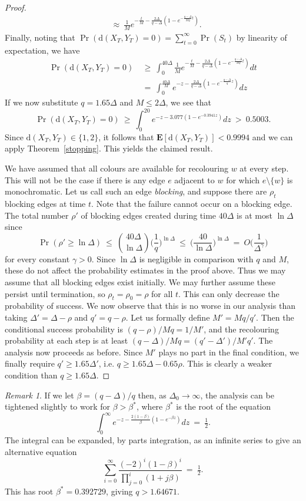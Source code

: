 \documentclass[11pt]{article}
\theoremstyle{definition}
\theoremstyle{remark}
\newtheorem{rem}[thm]{Remark}
\newcommand{\e}{\mathbf{E}}
\begin{document}
\begin{proof}
\begin{align*}
&\approx \ \frac{1}{M}
e^{-\frac{t}{M}-\frac{2\Delta}{q-\Delta}(1-e^{-\frac{q-\Delta}{Mq}t})}.
\end{align*}
Finally, noting that $\Pr(\mathrm{d}(X_T,Y_T)=0)=\sum_{t=0}^{\infty}
\Pr(S_t)$ by linearity of expectation, we have
\begin{align*}
\Pr(\mathrm{d}(X_T,Y_T)=0)\ &\geq\ \int_0^{40\Delta} \frac{1}{M} e^{-\frac{t}{M}-\frac{2\Delta}{q-\Delta}(1-e^{-\frac{q-\Delta}{Mq}t})}dt\\
&=\ \int_0^{\frac{40 \Delta}{M}}
e^{-z-\frac{2\Delta}{q-\Delta}(1-e^{-\frac{q-\Delta}{q}z})}dz
\end{align*}
If we now substitute $q=1.65 \Delta$ and $M\leq 2\Delta$, we see
that
\[\Pr(\mathrm{d}(X_T,Y_T)=0)\ \geq\ \int_0^{20} e^{-z-3.077(1-e^{-0.3941z})}dz\ >\
0.5003.\] Since $\mathrm{d}(X_T,Y_T)\in \{1,2\}$, it follows that
$\e[\mathrm{d}(X_T,Y_T)]< 0.9994$ and we can apply Theorem~\ref{stopping}.
This yields the claimed result.

We have assumed that all colours are available for recolouring $w$ at every
step. This will not be the case if there is any edge $e$ adjacent to $w$
for which $e\setminus\{w\}$ is monochromatic. Let us call such an edge
\emph{blocking}, and suppose there are $\rho_t$ blocking edges at time $t$.
Note that the failure cannot occur on a blocking edge. The total number
$\rho'$ of blocking edges created during time $40\Delta$ is at
most $\ln\Delta$ since%
\[ \Pr(\rho' \geq \ln\Delta)\ \leq\
\binom{40\Delta}{\ln\Delta}\Big(\frac{1}{q}\Big)^{\ln\Delta}\ \leq\
\Big(\frac{40}{\ln\Delta}\Big)^{\ln\Delta}\ =\ O\Big(\frac{1}{\Delta^\gamma}\Big)\]%
for every constant $\gamma>0$. Since $\ln\Delta$ is negligible in
comparison with $q$ and $M$, these do not affect the probability estimates
in the proof above. Thus we may assume that all blocking edges exist
initially. We may further assume these persist until termination, so
$\rho_t=\rho_0=\rho$ for all $t$. This can only decrease the probability of
success. We now observe that this is no worse in our analysis than taking
$\Delta'=\Delta-\rho$ and $q'=q-\rho$. Let us formally define $M'=Mq/q'$.
Then the conditional success probability is $(q-\rho)/Mq=1/M'$, and the
recolouring probability at each step is at least
$(q-\Delta)/Mq=(q'-\Delta')/M'q'$. The analysis now proceeds as before.
Since $M'$ plays no part in the final condition, we finally require $q'
\geq 1.65\Delta'$, i.e. $q \geq 1.65\Delta-0.65\rho$. This is clearly a
weaker condition than $q \geq 1.65\Delta$.
\end{proof}
\begin{rem}
If we let $\beta=(q-\Delta)/q$ then, as $\Delta_0\rightarrow\infty$, the
analysis can be tightened slightly to work for $\beta>\beta^*$, where
$\beta^*$ is the root of the
equation%
\[ \int_0^{\infty}
e^{-z-\frac{2(1-\beta)}{\beta}(1-e^{-\beta z})}dz\ =\ \tfrac{1}{2}.\]%
The integral can be expanded, by parts integration, as an infinite series
to give an alternative equation%
\[ \sum_{i=0}^\infty \frac{(-2)^i(1-\beta)^i}{\prod_{j=0}^i(1+j\beta)}\
=\ \tfrac{1}{2}.\]%
This has root $\beta^*=0.392729$, giving $q > 1.64671$.
\end{rem}
\end{document}

